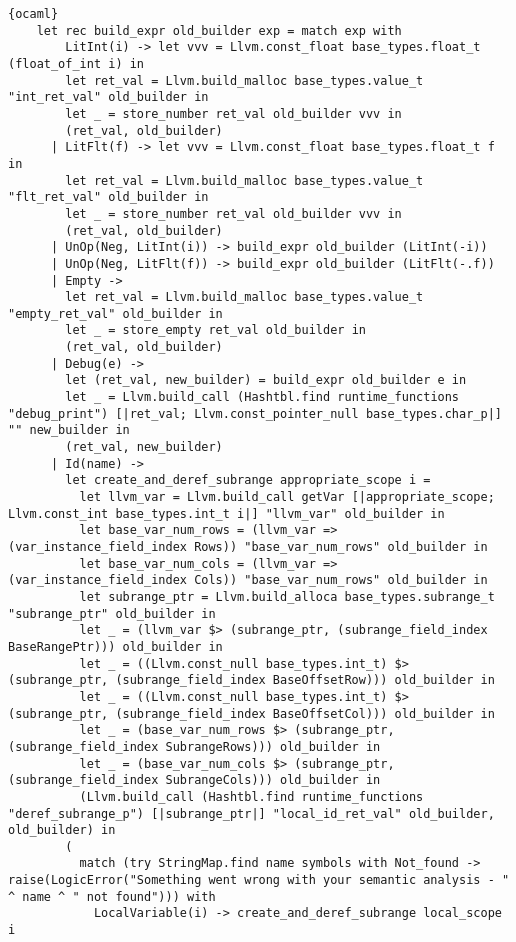 \begin{lstlisting}{ocaml}
    let rec build_expr old_builder exp = match exp with
        LitInt(i) -> let vvv = Llvm.const_float base_types.float_t (float_of_int i) in
        let ret_val = Llvm.build_malloc base_types.value_t "int_ret_val" old_builder in
        let _ = store_number ret_val old_builder vvv in
        (ret_val, old_builder)
      | LitFlt(f) -> let vvv = Llvm.const_float base_types.float_t f in
        let ret_val = Llvm.build_malloc base_types.value_t "flt_ret_val" old_builder in
        let _ = store_number ret_val old_builder vvv in
        (ret_val, old_builder)
      | UnOp(Neg, LitInt(i)) -> build_expr old_builder (LitInt(-i))
      | UnOp(Neg, LitFlt(f)) -> build_expr old_builder (LitFlt(-.f))
      | Empty ->
        let ret_val = Llvm.build_malloc base_types.value_t "empty_ret_val" old_builder in
        let _ = store_empty ret_val old_builder in
        (ret_val, old_builder)
      | Debug(e) ->
        let (ret_val, new_builder) = build_expr old_builder e in
        let _ = Llvm.build_call (Hashtbl.find runtime_functions "debug_print") [|ret_val; Llvm.const_pointer_null base_types.char_p|] "" new_builder in
        (ret_val, new_builder)
      | Id(name) ->
        let create_and_deref_subrange appropriate_scope i =
          let llvm_var = Llvm.build_call getVar [|appropriate_scope; Llvm.const_int base_types.int_t i|] "llvm_var" old_builder in
          let base_var_num_rows = (llvm_var => (var_instance_field_index Rows)) "base_var_num_rows" old_builder in
          let base_var_num_cols = (llvm_var => (var_instance_field_index Cols)) "base_var_num_rows" old_builder in
          let subrange_ptr = Llvm.build_alloca base_types.subrange_t "subrange_ptr" old_builder in
          let _ = (llvm_var $> (subrange_ptr, (subrange_field_index BaseRangePtr))) old_builder in
          let _ = ((Llvm.const_null base_types.int_t) $> (subrange_ptr, (subrange_field_index BaseOffsetRow))) old_builder in
          let _ = ((Llvm.const_null base_types.int_t) $> (subrange_ptr, (subrange_field_index BaseOffsetCol))) old_builder in
          let _ = (base_var_num_rows $> (subrange_ptr, (subrange_field_index SubrangeRows))) old_builder in
          let _ = (base_var_num_cols $> (subrange_ptr, (subrange_field_index SubrangeCols))) old_builder in
          (Llvm.build_call (Hashtbl.find runtime_functions "deref_subrange_p") [|subrange_ptr|] "local_id_ret_val" old_builder, old_builder) in
        (
          match (try StringMap.find name symbols with Not_found -> raise(LogicError("Something went wrong with your semantic analysis - " ^ name ^ " not found"))) with
            LocalVariable(i) -> create_and_deref_subrange local_scope i

\end{lstlisting}
